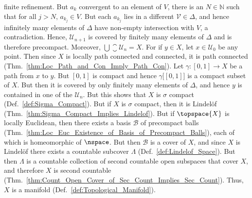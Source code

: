 \documentclass{article}                                                        %
\begin{document}
\begin{solution}
            finite refinement. But $a_{k}$ convergent to an element of $V$,
            there is an $N\in\mathbb{N}$ such that for all $j>N$,
            $a_{k_{j}}\in{V}$. But each $a_{k_{j}}$ lies in a different
            $\mathcal{V}\in\Delta$, and hence infinitely many elements of
            $\Delta$ have non-empty intersection with $V$, a contradiction.
            Hence, $\mathcal{U}_{n+1}$ is covered by finitely many elements of
            $\Delta$ and is therefore precompact. Moreover,
            $\bigcup\closure{\mathcal{U}_{n}}=X$. For if $y\in{X}$, let
            $x\in\mathcal{U}_{0}$ be any point. Then since $X$ is locally path
            connected and connected, it is path connected
            (Thm.~\ref{thm:Loc_Path_and_Con_Imply_Path_Con}).
            Let $\gamma:[0,1]\rightarrow{X}$ be a path from $x$ to $y$. But
            $[0,1]$ is compact and hence $\gamma\big[[0,1]\big]$ is a compact
            subset of $X$. But then it is covered by only finitely many elements
            of $\Delta$, and hence $y$ is contained in one of the
            $\mathcal{U}_{n}$. But this shows that $X$ is $\sigma$ compact
            (Def.~\ref{def:Sigma_Compact}). But if $X$ is $\sigma$ compact, then
            it is Lindel\"{o}f (Thm.~\ref{thm:Sigma_Compact_Implies_Lindelof}).
            But if $\topspace{X}$ is locally Euclidean, then there exists a
            basis $\mathcal{B}$ of precompact balls
            (Thm.~\ref{thm:Loc_Euc_Existence_of_Basis_of_Precompact_Balls}),
            each of which is homeomorphic of $\nspace$. But then $\mathcal{B}$
            is a cover of $X$, and since $X$ is Lindel\"{o}f there exists a
            countable subcover $\Lambda$ (Def.~\ref{def:Lindelof_Space}). But
            then $\Lambda$ is a countable collection of second countable open
            subspaces that cover $X$, and therefore $X$ is second countable
            (Thm.~\ref{thm:Count_Open_Cover_of_Sec_Count_Implies_Sec_Count}).
            Thus, $X$ is a manifold (Def.~\ref{def:Topological_Manifold}).
        \end{solution}
\end{document}
